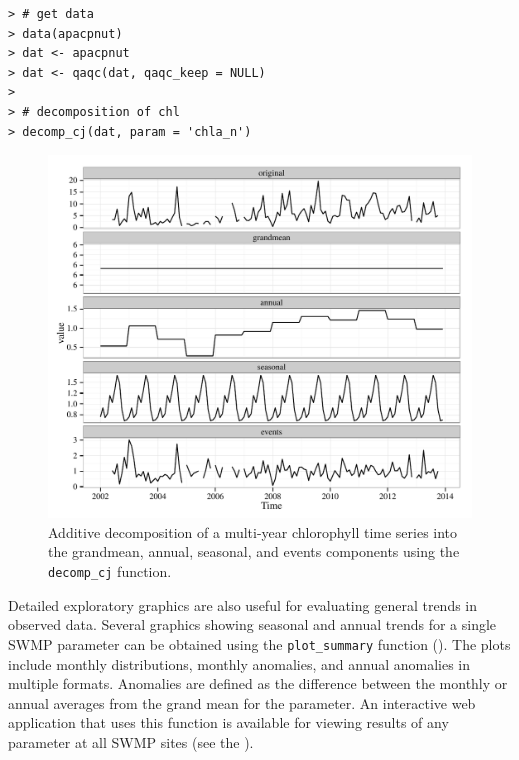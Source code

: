 \documentclass[10pt,letterpaper]{article}\usepackage[]{graphicx}\usepackage[]{color}
\makeatletter
\def\maxwidth{ %
  \ifdim\Gin@nat@width>\linewidth
    \linewidth
  \else
    \Gin@nat@width
  \fi
}
\newenvironment{kframe}{%
 \def\at@end@of@kframe{}%
 \ifinner\ifhmode%
  \def\at@end@of@kframe{\end{minipage}}%
  \begin{minipage}{\columnwidth}%
 \fi\fi%
 \def\FrameCommand##1{\hskip\@totalleftmargin \hskip-\fboxsep
 \colorbox{shadecolor}{##1}\hskip-\fboxsep
     \hskip-\linewidth \hskip-\@totalleftmargin \hskip\columnwidth}%
 \MakeFramed {\advance\hsize-\width
   \@totalleftmargin\z@ \linewidth\hsize
   \@setminipage}}%
 {\par\unskip\endMakeFramed%
 \at@end@of@kframe}
\newenvironment{knitrout}{}{} %
\makeatother
\begin{document}
\begin{knitrout}\small
{}\color{fgcolor}\begin{kframe}
\begin{verbatim}
> # get data
> data(apacpnut)
> dat <- apacpnut
> dat <- qaqc(dat, qaqc_keep = NULL)
> 
> # decomposition of chl
> decomp_cj(dat, param = 'chla_n')
\end{verbatim}
\end{kframe}\begin{figure}[!ht]


{\centering \includegraphics[width=\maxwidth]{figure/decomp_ex2} 

}

\caption[Additive decomposition of a multi-year chlorophyll time series into the grandmean, annual, seasonal, and events components using the \texttt{decomp\_cj} function]{Additive decomposition of a multi-year chlorophyll time series into the grandmean, annual, seasonal, and events components using the \texttt{decomp\_cj} function.\label{fig:decomp_ex2}}
\end{figure}


\end{knitrout}

Detailed exploratory graphics are also useful for evaluating general trends in observed data.  Several graphics showing seasonal and annual trends for a single SWMP parameter can be obtained using the \texttt{plot\_summary} function ().  The plots include monthly distributions, monthly anomalies, and annual anomalies in multiple formats.  Anomalies are defined as the difference between the monthly or annual averages from the grand mean for the parameter.  An interactive web application \cite{Chang15} that uses this function is available for viewing results of any parameter at all \ac{SWMP} sites (see the ).
\end{document}
